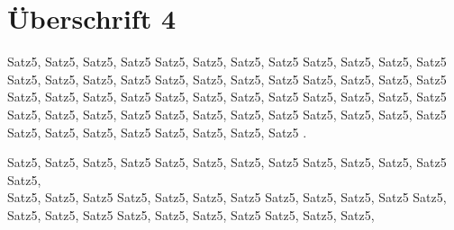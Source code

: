 \section{Überschrift 4}

Satz5, Satz5, Satz5, Satz5 Satz5, Satz5, Satz5, Satz5 Satz5, Satz5, Satz5, Satz5 Satz5, Satz5, Satz5, Satz5 Satz5, Satz5, Satz5, Satz5 
Satz5, Satz5, Satz5, Satz5 Satz5, Satz5, Satz5, Satz5 Satz5, Satz5, Satz5, Satz5 Satz5, Satz5, Satz5, Satz5 Satz5, Satz5, Satz5, Satz5 
Satz5, Satz5, Satz5, Satz5 Satz5, Satz5, Satz5, Satz5 Satz5, Satz5, Satz5, Satz5 Satz5, Satz5, Satz5, Satz5 .


Satz5, Satz5, Satz5, Satz5 Satz5, Satz5, Satz5, Satz5 Satz5, Satz5, Satz5, Satz5 Satz5, \\
Satz5, Satz5, Satz5 Satz5, Satz5, Satz5, Satz5 
Satz5, Satz5, Satz5, Satz5 Satz5, Satz5, Satz5, Satz5 Satz5, Satz5, Satz5, Satz5 Satz5, Satz5, Satz5,